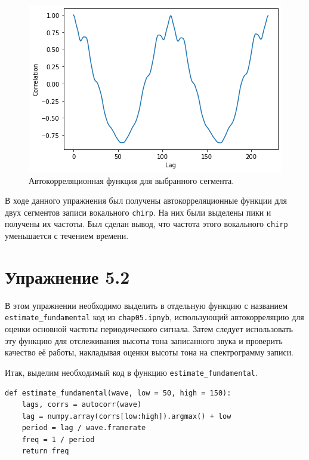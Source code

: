\documentclass[a4paper, 14pt]{extarticle}
\begin{document}
    \begin{figure}[H]
        \centering
        \includegraphics[width=0.8\linewidth]{resources/Images/task1_autocorr_1}
        \caption{Автокорреляционная функция для выбранного сегмента.}
        \label{fig:task1_autocorr_2}
    \end{figure}

    В ходе данного упражнения был получены автокорреляционные функции для двух сегментов записи вокального \texttt{chirp}.
    На них были выделены пики и получены их частоты.
    Был сделан вывод, что частота этого вокального \texttt{chirp} уменьшается с течением времени.

    \newpage

    \section{Упражнение 5.2}
    \label{sec:task2}

    В этом упражнении необходимо выделить в отдельную функцию с названием \texttt{estimate\_fundamental} код из
    \texttt{chap05.ipnyb}, использующий автокорреляцию для оценки основной частоты периодического сигнала.
    Затем следует использовать эту функцию для отслеживания высоты тона записанного звука и проверить качество её работы,
    накладывая оценки высоты тона на спектрограмму записи.

    Итак, выделим необходимый код в функцию \texttt{estimate\_fundamental}.

    \begin{lstlisting}[caption= Функция \texttt{estimate\_fundamental}., label={lst:task2_fun}]
def estimate_fundamental(wave, low = 50, high = 150):
    lags, corrs = autocorr(wave)
    lag = numpy.array(corrs[low:high]).argmax() + low
    period = lag / wave.framerate
    freq = 1 / period
    return freq     \end{lstlisting}
\end{document}
